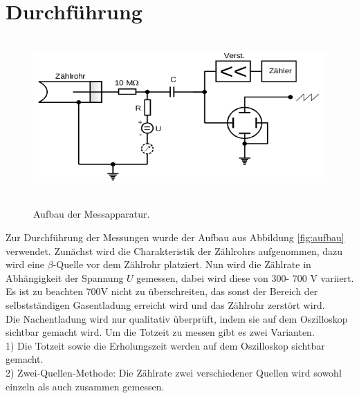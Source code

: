 \section{Durchführung}
\label{sec:Durchführung}

\begin{figure}
  \centering
  \includegraphics[height=6cm]{aufbau.png}
  \caption{Aufbau der Messapparatur.}
  \cite{skript}
  \label{fig:aufnau}
\end{figure}
Zur Durchführung der Messungen wurde der Aufbau aus Abbildung \ref{fig:aufbau}
verwendet. Zunächst wird die Charakteristik der Zählrohrs aufgenommen, dazu
wird eine $\beta$-Quelle vor dem Zählrohr platziert. Nun wird die
Zählrate in Abhängigkeit der Spannung $U$ gemessen, dabei wird diese
von 300- 700 \;V variiert. Es ist zu beachten 700\;V nicht zu überschreiten, das
sonst der Bereich der selbstständigen Gasentladung erreicht wird und das
Zählrohr zerstört wird.\\
Die Nachentladung wird nur qualitativ überprüft, indem sie auf dem
Oszilloskop sichtbar gemacht wird.
Um die Totzeit zu messen gibt es zwei Varianten.\\
1) Die Totzeit sowie die Erholungszeit werden auf dem Oszilloskop sichtbar gemacht.\\
2) Zwei-Quellen-Methode: Die Zählrate zwei verschiedener Quellen wird
 sowohl einzeln als auch zusammen gemessen.

